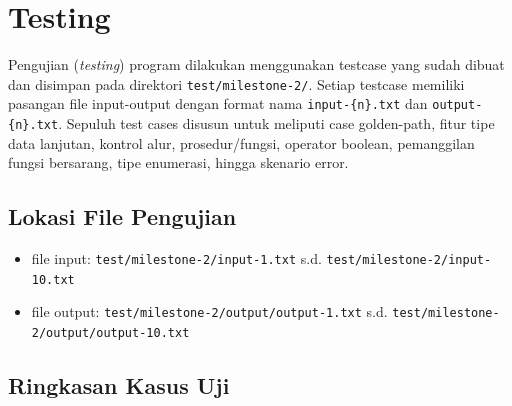 \documentclass[11pt,a4paper]{article}
\begin{document}
\section{Testing}

Pengujian (\textit{testing}) program dilakukan menggunakan testcase yang sudah dibuat
dan disimpan pada direktori \texttt{test/milestone-2/}. Setiap testcase memiliki
pasangan file input-output dengan format nama \texttt{input-\{n\}.txt} dan
\texttt{output-\{n\}.txt}. Sepuluh test cases disusun untuk meliputi case golden-path,
fitur tipe data lanjutan, kontrol alur, prosedur/fungsi, operator boolean,
pemanggilan fungsi bersarang, tipe enumerasi, hingga skenario error.

\subsection{Lokasi File Pengujian}

\begin{itemize}
    \item file input: \texttt{test/milestone-2/input-1.txt} s.d. \texttt{test/milestone-2/input-10.txt}
    \item file output: \texttt{test/milestone-2/output/output-1.txt} s.d. \texttt{test/milestone-2/output/output-10.txt}
\end{itemize}

\subsection{Ringkasan Kasus Uji}
\end{document}
